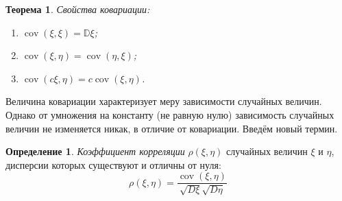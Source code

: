 \documentclass[oneside,final,14pt]{extreport}
\newtheorem{thm}{Теорема}[section]
\theoremstyle{definition}
\newtheorem{defn}{Определение}[section]
\begin{document}
\begin{thm}
    Свойства ковариации:
    \begin{enumerate}
        \item $\operatorname{cov}(\xi, \xi)=\mathbb{D} \xi$;
        \item $\operatorname{cov}(\xi, \eta)=\operatorname{cov}(\eta, \xi)$;
        \item $\operatorname{cov}(c \xi, \eta)=c \operatorname{cov}(\xi, \eta)$.
    \end{enumerate}
\end{thm}

Величина ковариации характеризует меру зависимости случайных величин. Однако от умножения на константу (не равную нулю) зависимость случайных величин не изменяется никак, в отличие от ковариации. Введём новый термин.

\begin{defn}
    {\it Коэффициент корреляции} $\rho(\xi,\eta)$ случайных величин $\xi$ и $\eta$, дисперсии которых существуют и отличны от нуля:
    \begin{equation*}
        \rho(\xi, \eta)=\frac{\operatorname{cov}(\xi, \eta)}{\sqrt{D \xi} \sqrt{D \eta}}
    \end{equation*}
\end{defn}
\end{document}
